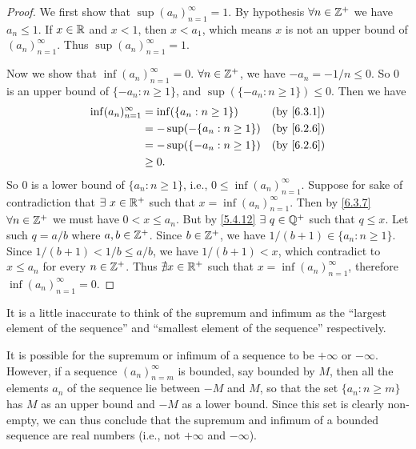\begin{proof}
  We first show that \(\sup(a_n)_{n = 1}^\infty = 1\).
  By hypothesis \(\forall n \in \mathbb{Z}^+\) we have \(a_n \leq 1\).
  If \(x \in \mathbb{R}\) and \(x < 1\), then \(x < a_1\), which means \(x\) is not an upper bound of \((a_n)_{n = 1}^\infty\).
  Thus \(\sup(a_n)_{n = 1}^\infty = 1\).

  Now we show that \(\inf(a_n)_{n = 1}^\infty = 0\).
  \(\forall n \in \mathbb{Z}^+\), we have \(-a_n = -1 / n \leq 0\).
  So \(0\) is an upper bound of \(\{-a_n : n \geq 1\}\), and \(\sup(\{-a_n : n \geq 1\}) \leq 0\).
  Then we have
  \begin{align*}
    \inf(a_n)_{n = 1}^\infty & = \inf(\{a_n : n \geq 1\})   &  & \text{(by \cref{6.3.1})} \\
                             & = -\sup(-\{a_n : n \geq 1\}) &  & \text{(by \cref{6.2.6})} \\
                             & = -\sup(\{-a_n : n \geq 1\}) &  & \text{(by \cref{6.2.6})} \\
                             & \geq 0.
  \end{align*}
  So \(0\) is a lower bound of \(\{a_n : n \geq 1\}\), i.e., \(0 \leq \inf(a_n)_{n = 1}^\infty\).
  Suppose for sake of contradiction that \(\exists\ x \in \mathbb{R}^+\) such that \(x = \inf(a_n)_{n = 1}^\infty\).
  Then by \cref{6.3.7} \(\forall n \in \mathbb{Z}^+\) we must have \(0 < x \leq a_n\).
  But by \cref{5.4.12} \(\exists\ q \in \Q^+\) such that \(q \leq x\).
  Let such \(q = a / b\) where \(a, b \in \mathbb{Z}^+\).
  Since \(b \in \mathbb{Z}^+\), we have \(1 / (b + 1) \in \{a_n : n \geq 1\}\).
  Since \(1 / (b + 1) < 1 / b \leq a / b\), we have \(1 / (b + 1) < x\), which contradict to \(x \leq a_n\) for every \(n \in \mathbb{Z}^+\).
  Thus \(\nexists x \in \mathbb{R}^+\) such that \(x = \inf(a_n)_{n = 1}^\infty\), therefore \(\inf(a_n)_{n = 1}^\infty = 0\).
\end{proof}

\begin{note}
  It is a little inaccurate to think of the supremum and infimum as the ``largest element of the sequence'' and ``smallest element of the sequence'' respectively.
\end{note}

\begin{note}
  It is possible for the supremum or infimum of a sequence to be \(+\infty\) or \(-\infty\).
  However, if a sequence \((a_n)_{n = m}^\infty\) is bounded, say bounded by \(M\), then all the elements \(a_n\) of the sequence lie between \(-M\) and \(M\), so that the set \(\{a_n : n \geq m\}\) has \(M\) as an upper bound and \(-M\) as a lower bound.
  Since this set is clearly non-empty, we can thus conclude that the supremum and infimum of a bounded sequence are real numbers (i.e., not \(+\infty\) and \(-\infty\)).
\end{note}

